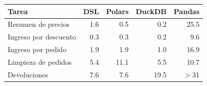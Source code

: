 \begin{tabular}{@{}lrrrr@{}}
\toprule
Tarea & DSL & Polars & DuckDB & Pandas \\
\midrule
Resumen de precios & 1.6 & 0.5 & 0.2 & 25.5 \\
Ingreso por descuento & 0.3 & 0.3 & 0.2 & 9.6 \\
Ingreso por pedido & 1.9 & 1.9 & 1.0 & 16.9 \\
Limpieza de pedidos & 5.4 & 11.1 & 5.5 & 10.7 \\
Devoluciones & 7.6 & 7.6 & 19.5 & $>$31 \\
\bottomrule
\end{tabular}